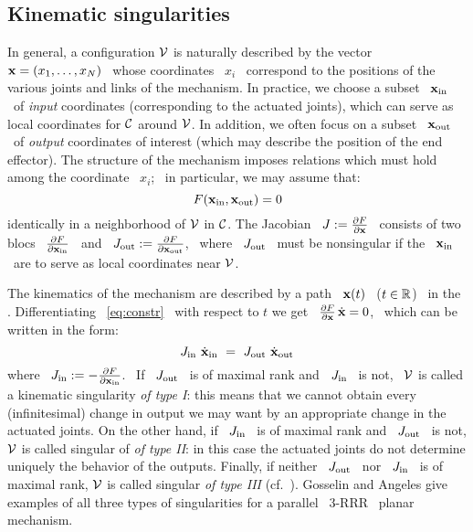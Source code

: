 \subsection{Kinematic singularities}
\label{sks}
%
In general, a configuration $\mathcal{V}$ is naturally described by the vector \
$\mathbf{x}=(x_{1},\dotsc,x_{N})$ \ whose coordinates \ $x_{i}$ \ correspond
to the positions of the various joints and links of the mechanism.
In practice, we choose a subset \ $\mathbf{x}_{\operatorname{in}}$ \
of \emph{input} coordinates (corresponding to the actuated joints),
which can serve as local coordinates for $\mathcal{C}$ around $\mathcal{V}$. In
addition, we often focus on a subset \ $\mathbf{x}_{\operatorname{out}}$ \ of \emph{output}
coordinates of interest (which may describe the position of the end
effector). The structure of the mechanism imposes relations which must
hold among the coordinate \ $x_{i}$; \ in particular, we may assume that:
%
\begin{equation}\label{eq:constr}
%
F(\bx_{\iin},\bx_{\out})=0
%
\end{equation}
%
identically in a neighborhood of $\mathcal{V}$ in $\mathcal{C}$. The Jacobian \
$J:=\frac{\partial F}{\partial\mathbf{x}}$ \ consists of two blocs \
$\frac{\partial F}{\partial\mathbf{x}_{\operatorname{in}}}$ \ and \
$J_{\operatorname{out}}:=\frac{\partial F}{\partial\mathbf{x}_{\operatorname{out}}}$, \ where \
$J_{\operatorname{out}}$ \ must be nonsingular if the \ $\mathbf{x}_{\operatorname{in}}$ \ are to serve
as local coordinates near $\mathcal{V}$.

The kinematics of the mechanism are described by a path \ $\mathbf{x}(t)$
\ ($t\in\mathbb{R}$) \ in the \cspace. Differentiating \
\eqref{eq:constr} \ with respect to $t$ we get \ $\frac{\partial
F}{\partial\mathbf{x}}\,\dot{\mathbf{x}}=0$, \ which can be written in the form:
%
\begin{equation} \label{eq:gosselin_sing}
%
J_{\iin}\ \dot{\bx}_{\iin}~=~J_{\out}\ \dot{\bx}_{\out}
%
\end{equation}
%
where \ $J_{\operatorname{in}}:=-\frac{\partial F}{\partial\mathbf{x}_{\operatorname{in}}}$. \ If \
$J_{\operatorname{out}}$ \ is of maximal rank and \ $J_{\operatorname{in}}$ \ is not, \
$\mathcal{V}$ is called a kinematic singularity \emph{of type I}: this
means that we cannot obtain every (infinitesimal) change in output we
may want by an appropriate change in the actuated joints.
On the other hand, if \ $J_{\operatorname{in}}$ \ is of maximal rank and  \
$J_{\operatorname{out}}$ \ is not, $\mathcal{V}$ is called singular of \emph{of type II}: in
this case the actuated joints do not determine uniquely the behavior
of the outputs.
Finally, if neither \ $J_{\operatorname{out}}$ \ nor \ $J_{\operatorname{in}}$ \ is of maximal
rank, $\mathcal{V}$ is called singular \emph{of type III} (cf.\ \cite{GA}).
Gosselin and Angeles give examples of all three types of
singularities for a parallel \ $3$-RRR \ planar mechanism.

